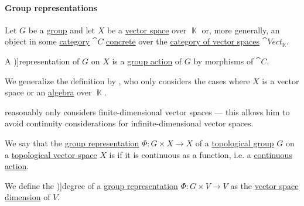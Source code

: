 \paragraph{Group representations}

\begin{definition}\label{def:group_representation}\mimprovised
  Let \( G \) be a \hyperref[def:group]{group} and let \( X \) be a \hyperref[def:vector_space]{vector space} over \( \BbbK \) or, more generally, an object in some \hyperref[def:category]{category} \( \cat{C} \) \hyperref[def:concrete_category]{concrete} over the \hyperref[def:vector_space]{category of vector spaces} \( \cat{Vect}_\BbbK \).

  A \term[ru=линейное представление (\cite[def. 11.1.1]{Винберг2014КурсАлгебры})]{representation} of \( G \) on \( X \) is a \hyperref[def:group_action]{group action} of \( G \) by morphisms of \( \cat{C} \).
\end{definition}
\begin{comments}
  \item We generalize the definition by , who only considers the cases where \( X \) is a vector space or an \hyperref[def:algebra_over_ring]{algebra} over \( \BbbK \).

   reasonably only considers finite-dimensional vector spaces --- this allows him to avoid continuity considerations for infinite-dimensional vector spaces.
\end{comments}

\begin{definition}\label{def:continuous_group_representation}
  We say that the \hyperref[def:group_representation]{group representation} \( \Phi: G \times X \to X \) of a \hyperref[def:topological_group]{topological group} \( G \) on a \hyperref[def:topological_vector_space]{topological vector space} \( X \) is  if it is continuous as a function, i.e. a \hyperref[def:continuous_monoid_action]{continuous action}.
\end{definition}

\begin{definition}\label{def:group_representation_degree}
  We define the \term[ru=размерность (представления) (\cite[def. 11.1.1]{Винберг2014КурсАлгебры})]{degree} of a \hyperref[def:group_representation]{group representation} \( \Phi: G \times V \to V \) as the \hyperref[def:vector_space_dimension]{vector space dimension} of \( V \).
\end{definition}

